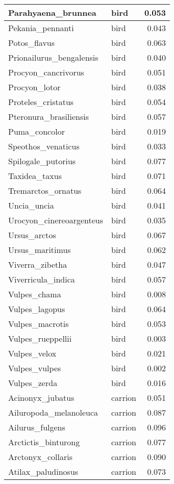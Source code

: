 \begin{table}
\begin{tabular}[t]{l|l|r}
\hline
Parahyaena\_brunnea & bird & 0.053\\
\hline
Pekania\_pennanti & bird & 0.043\\
\hline
Potos\_flavus & bird & 0.063\\
\hline
Prionailurus\_bengalensis & bird & 0.040\\
\hline
Procyon\_cancrivorus & bird & 0.051\\
\hline
Procyon\_lotor & bird & 0.038\\
\hline
Proteles\_cristatus & bird & 0.054\\
\hline
Pteronura\_brasiliensis & bird & 0.057\\
\hline
Puma\_concolor & bird & 0.019\\
\hline
Speothos\_venaticus & bird & 0.033\\
\hline
Spilogale\_putorius & bird & 0.077\\
\hline
Taxidea\_taxus & bird & 0.071\\
\hline
Tremarctos\_ornatus & bird & 0.064\\
\hline
Uncia\_uncia & bird & 0.041\\
\hline
Urocyon\_cinereoargenteus & bird & 0.035\\
\hline
Ursus\_arctos & bird & 0.067\\
\hline
Ursus\_maritimus & bird & 0.062\\
\hline
Viverra\_zibetha & bird & 0.047\\
\hline
Viverricula\_indica & bird & 0.057\\
\hline
Vulpes\_chama & bird & 0.008\\
\hline
Vulpes\_lagopus & bird & 0.064\\
\hline
Vulpes\_macrotis & bird & 0.053\\
\hline
Vulpes\_rueppellii & bird & 0.003\\
\hline
Vulpes\_velox & bird & 0.021\\
\hline
Vulpes\_vulpes & bird & 0.002\\
\hline
Vulpes\_zerda & bird & 0.016\\
\hline
Acinonyx\_jubatus & carrion & 0.051\\
\hline
Ailuropoda\_melanoleuca & carrion & 0.087\\
\hline
Ailurus\_fulgens & carrion & 0.096\\
\hline
Arctictis\_binturong & carrion & 0.077\\
\hline
Arctonyx\_collaris & carrion & 0.090\\
\hline
Atilax\_paludinosus & carrion & 0.073\\

\end{tabular}
\end{table}

